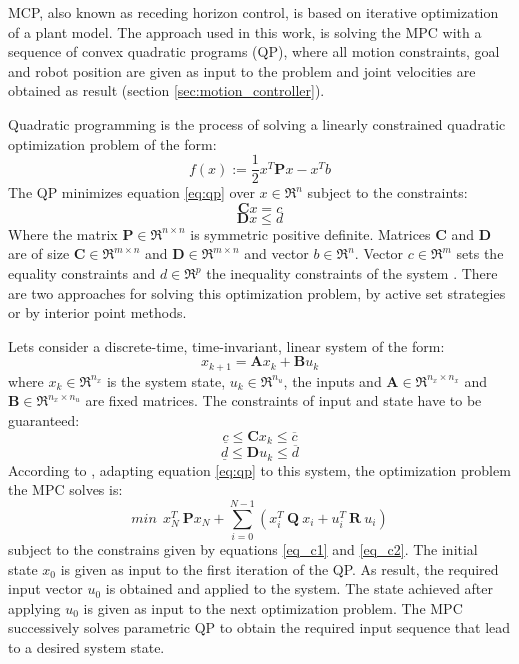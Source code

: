 MCP, also known as receding horizon control, is based on iterative optimization of a plant model. The approach used in this work, is solving the MPC with a sequence of convex quadratic programs (QP), where all motion constraints, goal and robot position are given as input to the problem and joint velocities are obtained as result (section \ref{sec:motion_controller}).

Quadratic programming is the process of solving a linearly constrained quadratic optimization problem of the form:
\begin{equation}
f(x):= \frac{1}{2}x^{T}\textbf{P}x - x^{T}b 
\label{eq:qp}
\end{equation}
The QP minimizes equation \ref{eq:qp} over $x \in \Re ^{n}$ subject to the constraints:
$$\textbf{C}x = c $$
$$\textbf{D}x \leq d$$
Where the matrix $\textbf{P} \in \Re ^{n \times n}$ is symmetric positive definite. Matrices $\textbf{C}$ and $\textbf{D}$ are of size $\textbf{C} \in \Re ^{m \times n}$ and $\textbf{D} \in \Re ^{m \times n}$ and vector $b \in \Re ^{n}$. Vector  $c \in \Re ^{m}$ sets the equality constraints and $d \in \Re ^{p}$ the inequality constraints of the system \citep{qp_theory}. There are two approaches for solving this optimization problem, by active set strategies or by interior point methods.

Lets consider a discrete-time, time-invariant, linear system of the form:
\begin{equation}
x_{k+1} =  \textbf{A}x_{k} + \textbf{B}u_{k}
\end{equation} 
where $x_{k} \in \Re^{n_{x}}$ is the system state, $u_{k} \in \Re ^{n_{u}}$, the inputs and $\textbf{A} \in \Re ^{n_{x} \times n_{x}}$  and $\textbf{B} \in \Re ^{n_{x} \times n_{u}}$ are fixed matrices. The constraints of input and state have to be guaranteed:
\begin{equation}
\underline{c} \leq \textbf{C}x_k \leq \overline{c}
\label{eq_c1}
\end{equation} 
\begin{equation}
\underline{d} \leq \textbf{D}u_k \leq \overline{d}
\label{eq_c2}
\end{equation} 
According to \citet{qp_algorithm}, adapting equation \ref{eq:qp} to this system, the optimization problem the MPC solves is:
\begin{equation}
min\ \ x_{N}^{T}\ \textbf{P}x_N + \sum_{i=0}^{N-1} (x_{i}^{T}\ \textbf{Q}\ x_i + u_{i}^{T}\ \textbf{R}\ u_i)
\end{equation} 
subject to the constrains given by equations \ref{eq_c1} and \ref{eq_c2}. The initial state $x_0$ is given as input to the first iteration of the QP. As result, the required input vector $u_0$ is obtained and applied to the system. The state achieved after applying $u_0$ is given as input to the next optimization problem. The MPC successively solves parametric QP to obtain the required input sequence that lead to a desired system state.

